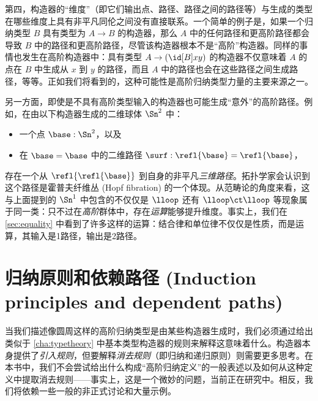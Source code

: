 %
第四，构造器的“维度”（即它们输出点、路径、路径之间的路径等）与生成的类型在哪些维度上具有非平凡同伦之间没有直接联系。一个简单的例子是，如果一个归纳类型 $B$ 具有类型为 $A\to B$ 的构造器，那么 $A$ 中的任何路径和更高阶路径都会导致 $B$ 中的路径和更高阶路径，尽管该构造器根本不是“高阶”构造器。同样的事情也发生在高阶构造器中：具有类型 $A\to (\id[B]xy)$ 的构造器不仅意味着 $A$ 的点在 $B$ 中生成从 $x$ 到 $y$ 的路径，而且 $A$ 中的路径也会在这些路径之间生成路径，等等。正如我们将看到的，这种可能性是高阶归纳类型力量的主要来源之一。

另一方面，即使是不具有高阶类型输入的构造器也可能生成“意外”的高阶路径。例如，在由以下构造器生成的二维球体 $\Sn^2$ 中：
%
\begin{itemize}
  \item 一个点 $\base:\Sn^2$，以及
  \item 在 ${\base=\base}$ 中的二维路径 $\surf:\refl{\base} = \refl{\base}$，
\end{itemize}
存在一个从 $\refl{\refl{\base}}$ 到自身的非平凡\emph{三维路径}。拓扑学家会认识到这个路径是霍普夫纤维丛 (Hopf fibration) 的一个体现。从范畴论的角度来看，这与上面提到的 $\Sn^1$ 中包含的不仅仅是 $\lloop$ 还有 $\lloop\ct\lloop$ 等现象属于同一类：只不过在\emph{高阶}群体中，存在\emph{运算}能够提升维度。事实上，我们在 \cref{sec:equality} 中看到了许多这样的运算：结合律和单位律不仅仅是性质，而是运算，其输入是1路径，输出是2路径。

%

\vspace*{0pt plus 20ex}

\section{归纳原则和依赖路径 (Induction principles and dependent paths)}
\label{sec:dependent-paths}

当我们描述像圆周这样的高阶归纳类型是由某些构造器生成时，我们必须通过给出类似于 \cref{cha:typetheory} 中基本类型构造器的规则来解释这意味着什么。构造器本身提供了\emph{引入规则}，但要解释\emph{消去规则}（即归纳和递归原则）则需要更多思考。在本书中，我们不会尝试给出什么构成“高阶归纳定义”的一般表述以及如何从这种定义中提取消去规则——事实上，这是一个微妙的问题，当前正在研究中。相反，我们将依赖一些一般的非正式讨论和大量示例。

